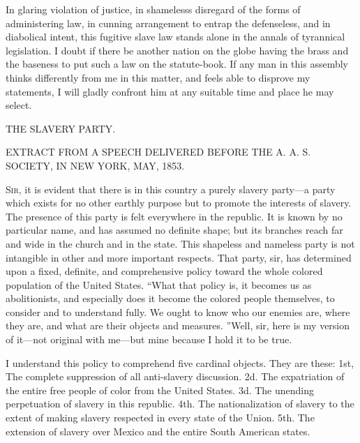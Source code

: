 In glaring violation of justice, in shamelesss disregard of the forms of
administering law, in cunning arrangement to entrap the
{\protect\hypertarget{450}{}{}}defenseless, and in diabolical intent,
this fugitive slave law stands alone in the annals of tyrannical
legislation. I doubt if there be another nation on the globe having the
brass and the baseness to put such a law on the statute-book. If any man
in this assembly thinks differently from me in this matter, and feels
able to disprove my statements, I will gladly confront him at any
suitable time and place he may select.

{\protect\hypertarget{ux5cux7bux5cux7bux5cux7b1ux5cux7dux5cux7dux5cux7d}{}{}}

{\protect\hypertarget{451}{}{}}

{THE SLAVERY PARTY.}

{EXTRACT FROM A SPEECH DELIVERED BEFORE THE A. A. S. SOCIETY, IN NEW
YORK, MAY, 1853.}

\textsc{Sir}, it is evident that there is in this country a purely
slavery party---a party which exists for no other earthly purpose but to
promote the interests of slavery. The presence of this party is felt
everywhere in the republic. It is known by no particular name, and has
assumed no definite shape; but its branches reach far and wide in the
church and in the state. This shapeless and nameless party is not
intangible in other and more important respects. That party, sir, has
determined upon a fixed, definite, and comprehensive policy toward the
whole colored population of the United States. ``What that policy is, it
becomes us as abolitionists, and especially does it become the colored
people themselves, to consider and to understand fully. We ought to know
who our enemies are, where they are, and what are their objects and
measures. ''Well, sir, here is my version of it---not original with
me---but mine because I hold it to be true.

I understand this policy to comprehend five cardinal objects. They are
these: 1st, The complete suppression of all anti-slavery discussion. 2d.
The expatriation of the entire free people of color from the United
States. 3d. The unending perpetuation of slavery in this republic. 4th.
The nationalization of slavery to the extent of making slavery respected
in every state of the Union. 5th. The extension of slavery over Mexico
and the entire South American states.

